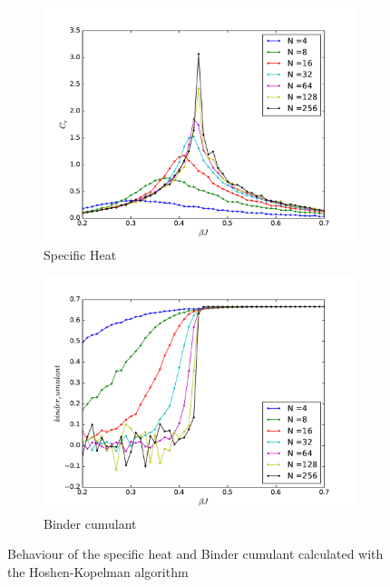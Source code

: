 \documentclass[twoside]{article}
\begin{document}
\begin{multicols}{2}
\begin{figure}[!tpb] 
 \begin{subfigure}[b]{0.35\textwidth}
    \includegraphics[width=\textwidth]{images/cv.pdf}
    \caption{Specific Heat}
    \label{cv}
  \end{subfigure}
  \begin{subfigure}[b]{0.35\textwidth}
    \includegraphics[width=\textwidth]{images/binder_cumulant.pdf}
    \caption{Binder cumulant}
    \label{bc}
  \end{subfigure}
  \caption{Behaviour of the specific heat and Binder cumulant calculated with the Hoshen-Kopelman algorithm}
\end{figure}


\end{multicols}
\end{document}
